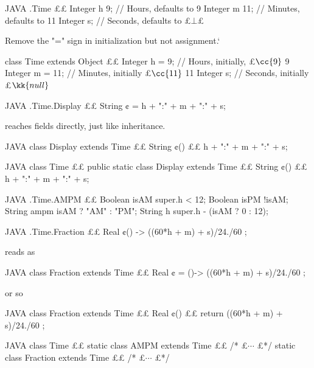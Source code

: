 \begin{code}{JAVA}
.Time {££
  Integer h 9; // Hours, defaults to 9
  Integer m 11; // Minutes, defaults to 11
  Integer s; // Seconds, defaults to £$⊥$£
}
\end{code}
Remove the "=" sign in initialization but not assignment.`
\begin{java}
class Time extends Object {££
  Integer h = 9; // Hours, initially, £$\cc{9}$ 9
  Integer m = 11; // Minutes, initially £$\cc{11}$ 11
  Integer s; // Seconds, initially £$\kk{null}$
}
\end{java}

\begin{code}{JAVA}
.Time.Display {££
  String ¢ = h + ":" + m + ":" + s;
}
\end{code}
reaches fields directly, just like inheritance.

\begin{code}{JAVA}
class Display extends Time {££
  String ¢() {££
     h + ":" + m + ":" + s;
  }
}
\end{code}

\begin{code}{JAVA}
class Time {££
  public static class Display extends Time {££
    String ¢() {££
       h + ":" + m + ":" + s;
    }
  }
}
\end{code}

\begin{code}{JAVA}
.Time.AMPM {££
  Boolean isAM super.h < 12;
  Boolean isPM !isAM;
  String ampm isAM ? "AM" : "PM";
  String h super.h - (isAM ? 0 : 12);
}
\end{code}

\begin{code}{JAVA}
.Time.Fraction {££
  Real ¢() -> ((60*h + m) + s)/24./60 ;
}
\end{code}
reads as
\begin{code}{JAVA}
class Fraction extends Time {££
  Real ¢ = ()-> ((60*h + m) + s)/24./60 ; 
}
\end{code}
or so
\begin{code}{JAVA}
class Fraction extends Time {££
  Real ¢() {££ return ((60*h + m) + s)/24./60 ; }
}
\end{code}

\begin{code}{JAVA}
class Time {££
  static class AMPM extends Time {££ /* £$⋯$ £*/ }
  static class Fraction extends Time {££ /* £$⋯$ £*/}
}
\end{code}


